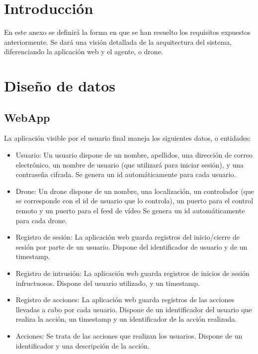 
\section{Introducción}
En este anexo se definirá la forma en que se han resuelto los requisitos expuestos anteriormente. Se dará una visión detallada de la arquitectura del sistema, diferenciando la aplicación web y el agente, o drone.

\section{Diseño de datos}
\subsection{WebApp}
La aplicación visible por el usuario final maneja los siguientes datos, o entidades:
\begin{itemize}
\item Usuario: Un usuario dispone de un nombre, apellidos, una dirección de correo electrónico, un nombre de usuario (que utilizará para iniciar sesión), y una contraseña cifrada. Se genera un id automáticamente para cada usuario.
\item Drone: Un drone dispone de un nombre, una localización, un controlador (que se corresponde con el id de usuario que lo controla), un puerto para el control remoto y un puerto para el feed de vídeo Se genera un id automáticamente para cada drone.
\item Registro de sesión: La aplicación web guarda registros del inicio/cierre de sesión por parte de un usuario. Dispone del identificador de usuario y de un timestamp.
\item Registro de intrusión: La aplicación web guarda registros de inicios de sesión infructuosos. Dispone del usuario utilizado, y un timestamp.
\item Registro de acciones: La aplicación web guarda registros de las acciones llevadas a cabo por cada usuario. Dispone de un identificador del usuario que realiza la acción, un timestamp y un identificador de la acción realizada.
\item Acciones: Se trata de las acciones que realizan los usuarios. Dispone de un identificador y una descripción de la acción.
\end{itemize}


